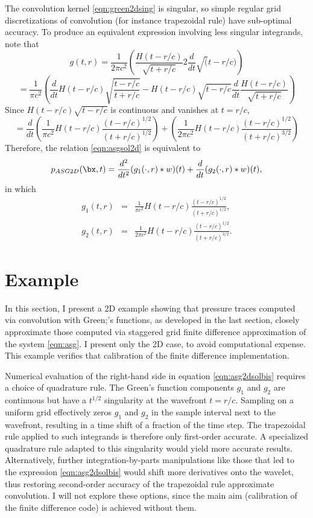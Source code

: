 The convolution kernel \ref{eqn:green2dsing} is singular, so simple
regular grid 
discretizations
of convolution (for instance trapezoidal rule) have sub-optimal accuracy. 
To produce an equivalent expression involving less singular
integrands, note that
\[
  g(t,r) = \frac{1}{2\pi c^2}
  \left(\frac{H(t-r/c)}{\sqrt{t+r/c}}2\frac{d}{dt}\sqrt(t-r/c)\right)
\]
\[
  =\frac{1}{\pi c^2}\left(\frac{d}{dt} H(t-r/c)
    \sqrt{\frac{t-r/c}{t+r/c}}
 - H(t-r/c)\sqrt{t-r/c}
    \frac{d}{dt}\frac{H(t-r/c)}{\sqrt{t+r/c}}\right)
\]
Since $H(t-r/c)\sqrt{t-r/c}$ is continuous and vanishes at $t=r/c$, 
\[
  = \frac{d}{dt} \left(\frac{1}{\pi c^2}H(t-r/c)
    \frac{(t-r/c)^{1/2}}{(t+r/c)^{1/2}} \right)+
  \left(\frac{1}{2\pi c^2} H(t-r/c)
    \frac{(t-r/c)^{1/2}}{(t+r/c)^{3/2}} \right)
\]
Therefore, the relation \ref{eqn:asgsol2d} is equivalent to
\begin{equation}
  \label{eqn:asg2dsolbis}
  p_{ASG2D}(\bx,t) = \frac{d^2}{dt^2}(g_1(\cdot, r) *w)(t) + \frac{d}{dt}(g_2(\cdot,r)*w)(t),
\end{equation}
in which
\begin{eqnarray}
  \label{eqn:green2dt1}
  g_1(t,r) &=& \frac{1}{\pi c^2}H(t-r/c)
               \frac{(t-r/c)^{1/2}}{(t+r/c)^{1/2}},\\
  \label{eqn:green2dt2}
  g_2(t,r) &=& \frac{1}{2\pi c^2} H(t-r/c)
               \frac{(t-r/c)^{1/2}}{(t+r/c)^{3/2}}.
\end{eqnarray}

\section{Example}
In this section, I present a 2D example showing that pressure traces
computed via convolution with Green;'s functions, as developed in the
last section, closely approximate
those computed via staggered
grid finite difference approximation of the system \ref{eqn:asg}. I
present only the 2D case, to avoid computational expense. This example
verifies that calibration of the finite difference implementation.

Numerical evaluation of the right-hand side in equation
\ref{eqn:asg2dsolbis} requires a choice of quadrature rule. The
Green's function components $g_1$ and $g_2$ are continuous but have a
$t^{1/2}$ singularity at the wavefront $t=r/c$. Sampling on a uniform
grid effectively zeros $g_1$ and $g_2$ in the sample interval next
to the wavefront, resulting in a time shift of a fraction of the time
step. The trapezoidal rule
applied to such integrands is therefore only first-order accurate. A
specialized quadrature rule adapted to this singularity would yield
more accurate results. Alternatively, further
integration-by-parts manipulations like those that led to the
expression \ref{eqn:asg2dsolbis} would shift more derivatives onto the
wavelet, thus restoring second-order accuracy of the trapezoidal rule
approximate convolution. I will not explore these options, since the
main aim (calibration of the finite difference code) is achieved
without them.

